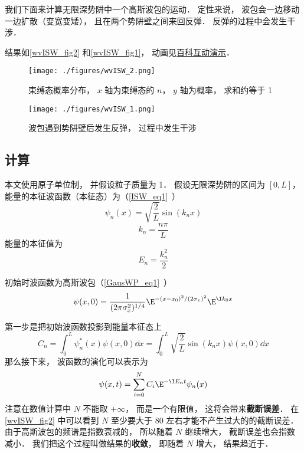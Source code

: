 

我们下面来计算无限深势阱中一个高斯波包的运动． 定性来说， 波包会一边移动一边扩散（变宽变矮）， 且在两个势阱壁之间来回反弹． 反弹的过程中会发生干涉．

结果如\autoref{wvISW_fig2} 和\autoref{wvISW_fig1}， 动画见\href{https://wuli.wiki/apps/wvISW.html}{百科互动演示}．

\begin{figure}[ht]
\centering
\texttt{[image: ./figures/wvISW\_2.png]}
\caption{束缚态概率分布， $x$ 轴为束缚态的 $n$， $y$ 轴为概率， 求和约等于 1} \label{wvISW_fig2}
\end{figure}

\begin{figure}[ht]
\centering
\texttt{[image: ./figures/wvISW\_1.png]}
\caption{波包遇到势阱壁后发生反弹， 过程中发生干涉} \label{wvISW_fig1}
\end{figure}

\subsection{计算}

本文使用原子单位制， 并假设粒子质量为 1． 假设无限深势阱的区间为 $[0, L]$， 能量的本征波函数（本征态）为（\autoref{ISW_eq1}~）
\begin{equation}
\psi _n(x) = \sqrt{\frac{2}{L}} \sin(k_n x)
\end{equation}
\begin{equation}
k_n = \frac{n\pi }{L}
\end{equation}
能量的本征值为
\begin{equation}
E_n = \frac{k_n^2}{2}
\end{equation}

初始时波函数为高斯波包（\autoref{GausWP_eq1}~）
\begin{equation}
\psi (x,0) = \frac{1}{(2\pi \sigma _x ^2)^{1/4}} \E^{-(x - x_0)^2/(2\sigma _x)^2} \E^{\I k_0x}
\end{equation}

第一步是把初始波函数投影到能量本征态上
\begin{equation}\label{wvISW_eq1}
C_n = \int_0^L \psi _n^*(x) \psi (x,0) \dd{x}
= \int_0^L \sqrt{\frac{2}{L}} \sin(k_n x) \psi (x,0) \dd{x}
\end{equation}
那么接下来， 波函数的演化可以表示为
\begin{equation}\label{wvISW_eq2}
\psi (x,t) = \sum _{i=0}^N C_i \E^{-\I E_n t} \psi _n(x)
\end{equation}
注意在数值计算中 $N$ 不能取 $+\infty$， 而是一个有限值， 这将会带来\textbf{截断误差}． 在\autoref{wvISW_fig2} 中可以看到 $N$ 至少要大于 80 左右才能不产生过大的的截断误差． 由于高斯波包的频谱是指数衰减的， 所以随着 $N$ 继续增大， 截断误差也会指数减小． 我们把这个过程叫做结果的\textbf{收敛}， 即随着 $N$ 增大， 结果趋近于．


